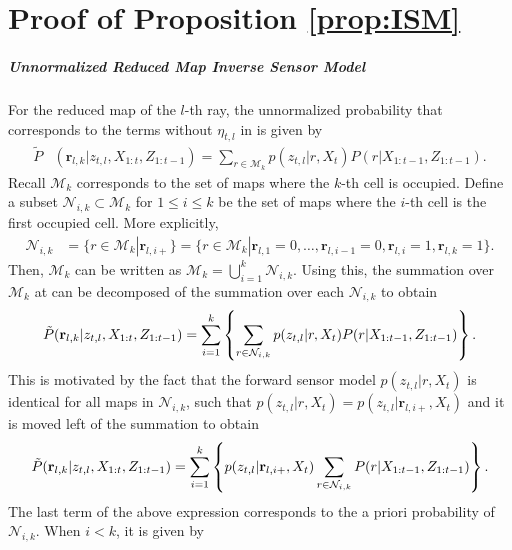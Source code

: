 \appendix
\doublespacing
\chapter{Proof of Proposition \ref{prop:ISM}}
\label{app:ISM}

\paragraph{Unnormalized Reduced Map Inverse Sensor Model}
For the reduced map of the $l$-th ray, the unnormalized probability that corresponds to the terms without $\eta_{t,l}$ in  is given by
\begin{align}
\tilde P&(\mathbf{r}_{l,k}|z_{t,l},X_{1:t},Z_{1:t-1})= \sum_{r\in\mathcal{M}_{k}} p(z_{t,l}|r,X_t) P(r|X_{1:t-1},Z_{1:t-1}).\label{eqn:tildePlk}
\end{align}
Recall $\mathcal{M}_k$ corresponds to the set of maps where the $k$-th cell is occupied. Define a subset $\mathcal{N}_{i,k}\subset \mathcal{M}_k$ for $1\leq i\leq k$ be the set of maps where the $i$-th cell is the first occupied cell. More explicitly, 
\begin{align*}
\mathcal{N}_{i,k} & = \{ r\in\mathcal{M}_k| \mathbf{r}_{l,i+}\}= \{ r\in\mathcal{M}_k| \mathbf{r}_{l,1}=0,\ldots, \mathbf{r}_{l,i-1}=0, \mathbf{r}_{l,i}=1,
\mathbf{r}_{l,k}=1\}.
\end{align*}
Then, $\mathcal{M}_k$ can be written as $\mathcal{M}_k =\bigcup_{i=1}^{k} \mathcal{N}_{i,k}$. Using this, the summation over $\mathcal{M}_k$ at  can be decomposed of the summation over each $\mathcal{N}_{i,k}$ to obtain
\begin{align*}
\tilde P(\mathbf{r}_{l,k}|z_{t,l},X_{1:t},Z_{1:t-1})= \sum_{i=1}^k\left\{ \sum_{r\in\mathcal{N}_{i,k}} p(z_{t,l}|r,X_t) P(r|X_{1:t-1},Z_{1:t-1}) \right\}.
\end{align*}
This is motivated by the fact that the forward sensor model $p(z_{t,l}|r,X_t)$ is identical for all maps in $\mathcal{N}_{i,k}$, such that $p(z_{t,l}|r,X_t)=p(z_{t,l}|\mathbf{r}_{l,i+},X_t)$ and it is moved left of the summation to obtain
\begin{align}
\tilde P(\mathbf{r}_{l,k}|z_{t,l},X_{1:t},Z_{1:t-1})= \sum_{i=1}^k \left\{ p(z_{t,l}|\mathbf{r}_{l,i+},X_t) \sum_{r\in\mathcal{N}_{i,k}} P(r|X_{1:t-1},Z_{1:t-1}) \right\}.\label{eqn:tildePlk0}
\end{align}
The last term of the above expression corresponds to the a priori probability of $\mathcal{N}_{i,k}$. When $i<k$, it is given by
